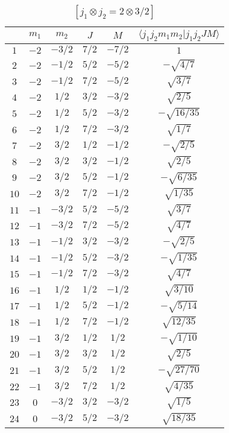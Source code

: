 \begin{table}
\tiny
\caption{$[j_1 \otimes j_2 = 2 \otimes 3/2]$}
\begin{center}
\begin{tabular}{|c|c|c|c|c|c|}
\hline 
   & $m_1$ & $m_2$ & $J$ & $M$ & $\langle j_1 j_2 m_1 m_2 | j_1 j_2 J M \rangle$ \\ 
\hline 
$1$ & $-2$ & $-3/2$ & $7/2$ & $-7/2$ & $1$ \\ 
$2$ & $-2$ & $-1/2$ & $5/2$ & $-5/2$ & $-\sqrt{4/7}$ \\ 
$3$ & $-2$ & $-1/2$ & $7/2$ & $-5/2$ & $\sqrt{3/7}$ \\ 
$4$ & $-2$ & $1/2$ & $3/2$ & $-3/2$ & $\sqrt{2/5}$ \\ 
$5$ & $-2$ & $1/2$ & $5/2$ & $-3/2$ & $-\sqrt{16/35}$ \\ 
$6$ & $-2$ & $1/2$ & $7/2$ & $-3/2$ & $\sqrt{1/7}$ \\ 
$7$ & $-2$ & $3/2$ & $1/2$ & $-1/2$ & $-\sqrt{2/5}$ \\ 
$8$ & $-2$ & $3/2$ & $3/2$ & $-1/2$ & $\sqrt{2/5}$ \\ 
$9$ & $-2$ & $3/2$ & $5/2$ & $-1/2$ & $-\sqrt{6/35}$ \\ 
$10$ & $-2$ & $3/2$ & $7/2$ & $-1/2$ & $\sqrt{1/35}$ \\ 
$11$ & $-1$ & $-3/2$ & $5/2$ & $-5/2$ & $\sqrt{3/7}$ \\ 
$12$ & $-1$ & $-3/2$ & $7/2$ & $-5/2$ & $\sqrt{4/7}$ \\ 
$13$ & $-1$ & $-1/2$ & $3/2$ & $-3/2$ & $-\sqrt{2/5}$ \\ 
$14$ & $-1$ & $-1/2$ & $5/2$ & $-3/2$ & $-\sqrt{1/35}$ \\ 
$15$ & $-1$ & $-1/2$ & $7/2$ & $-3/2$ & $\sqrt{4/7}$ \\ 
$16$ & $-1$ & $1/2$ & $1/2$ & $-1/2$ & $\sqrt{3/10}$ \\ 
$17$ & $-1$ & $1/2$ & $5/2$ & $-1/2$ & $-\sqrt{5/14}$ \\ 
$18$ & $-1$ & $1/2$ & $7/2$ & $-1/2$ & $\sqrt{12/35}$ \\ 
$19$ & $-1$ & $3/2$ & $1/2$ & $1/2$ & $-\sqrt{1/10}$ \\ 
$20$ & $-1$ & $3/2$ & $3/2$ & $1/2$ & $\sqrt{2/5}$ \\ 
$21$ & $-1$ & $3/2$ & $5/2$ & $1/2$ & $-\sqrt{27/70}$ \\ 
$22$ & $-1$ & $3/2$ & $7/2$ & $1/2$ & $\sqrt{4/35}$ \\ 
$23$ & $0$ & $-3/2$ & $3/2$ & $-3/2$ & $\sqrt{1/5}$ \\ 
$24$ & $0$ & $-3/2$ & $5/2$ & $-3/2$ & $\sqrt{18/35}$ \\ 

\end{tabular}
\end{center}
\end{table}
